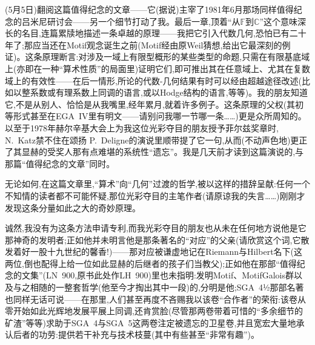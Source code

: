 (5月5日)翻阅这篇值得纪念的文章——它(据说)主宰了1981年6月那场同样值得纪念的吕米尼研讨会——另一个细节打动了我。最后一章,顶着“从$\mathbb{F}$到$\mathbb{C}$”这个意味深长的名目,连篇累牍地描述一条卓越的原理——我把它引入代数几何,恐怕已有二十年了;那应当还在Motif观念诞生之前(Motif经由原Weil猜想,给出它最\dmark{}深刻的例证)。这条原理断言:对涉及一域上有限型概形的某些类型的命题,只需在有限基底域上(亦即在一种“算术性质”的局面里)证明它们,即可推出其在任意域上、尤其在复数域上的有效性——在后一情形,所论的代数-几何结果有时可以经由超越途径改述(比如以整系数或有理系数上同调的语言,或以Hodge结构的语言,等等)。我的朋友知道它,不是从别人、恰恰是从我嘴里,经年累月,就着许多例子。这条原理的父权(其初等形式甚至在EGA~IV里有明文——请别问我哪一节哪一条……)更是众所周知的。以至于1978年赫尔辛基大会上为我这位光彩夺目的朋友授予菲尔兹奖章时, N.~Katz禁不住在颂扬 P.~Deligne的演说里顺带提了它一句,从而(不动声色地)更正了其显赫的受奖人那有点难堪的系统性“遗忘”。我是几天前才读到这篇演说的,与那篇“值得纪念的文章”同时。

无论如何,在这篇文章里,“算术”向“几何”过渡的哲学,被以这样的措辞呈献:任何一个不知情的读者都不可能怀疑,那位光彩夺目的主笔作者(请原谅\dmark{}我的失言……)刚刚才发现这条分量如此之大的奇妙原理。

诚然,我没有为这条方法申请专利,而我光彩夺目的朋友也从未在任何地方说他是它那神奇的发明者;正如他并未明言他是那条著名的“对应”的父亲(请欣赏这个词,它散发着好一股十九世纪的馨香!)——那对应被谦虚地记在Riemann与Hilbert名下(这两位,倒也配得上给一位如此显赫的后继者的孩子们当教父);正如他在那部“值得纪念的文集”(LN~900,原书此处作LH~900)里也未指明:发明Motif、MotifGalois群以及与之相随的一整套哲学(他至今才掏出其中一段)的,分明是他;SGA~4½那部名著也同样无话可说——在那里,人们甚至再度不吝赐我以该卷“合作者”的荣衔:该卷从零开始如此光辉地发展平展上同调,还肯赏脸(尽管那两卷带着可惜的“多余细节的矿渣”等等)求助于SGA~4与SGA~5这两卷注定被遗忘的卫星卷,并且宽宏大量地承认后者的功劳:提供若干补充与技术枝蔓(其中有些甚至“非常有趣”)。

